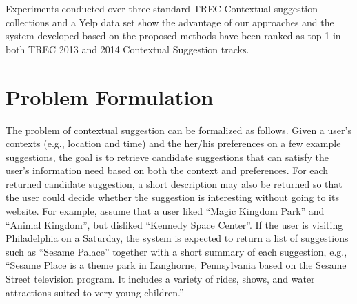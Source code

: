 Experiments conducted over three standard TREC Contextual suggestion 
collections and a Yelp data set show the advantage of our approaches and 
the system developed based on the proposed methods have been ranked as 
top 1 in both TREC 2013 and 2014 Contextual Suggestion tracks.




\section{Problem Formulation} 
\label{sec:chap5prob}

The problem of contextual suggestion can be formalized 
as follows. Given a user's contexts (e.g., location
and time) and the her/his preferences on a few example
suggestions, the goal is to retrieve candidate 
suggestions that can satisfy the user's information 
need based on both the context and preferences. 
For each returned candidate suggestion, a short description 
may also be returned so that the user could decide whether 
the suggestion is interesting without going to its website.
For example, assume that a user liked ``Magic Kingdom Park'' 
and ``Animal Kingdom'', but disliked ``Kennedy Space Center''. 
If the user is visiting Philadelphia on a Saturday, the system 
is expected to return a list of suggestions such as ``Sesame Palace'' 
together with a short summary of each suggestion, 
e.g., ``Sesame Place is a theme park in Langhorne, Pennsylvania based on 
the Sesame Street television program. It includes a variety of rides, shows, 
and water attractions suited to very young children.''

